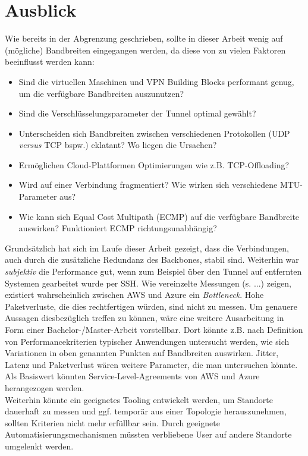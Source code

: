 \section{Ausblick}
Wie bereits in der Abgrenzung geschrieben, sollte in dieser Arbeit wenig auf (mögliche) Bandbreiten eingegangen werden, da diese von zu vielen Faktoren beeinflusst werden kann:
\begin{itemize}
    \item Sind die virtuellen Maschinen und VPN Building Blocks performant genug, um die verfügbare Bandbreiten auszunutzen?
    \item Sind die Verschlüsselungsparameter der Tunnel optimal gewählt?
    \item Unterscheiden sich Bandbreiten zwischen verschiedenen Protokollen (UDP \textit{versus} TCP bspw.) eklatant? Wo liegen die Ursachen?
    \item Ermöglichen Cloud-Plattformen Optimierungen wie z.B. TCP-Offloading?
    \item Wird auf einer Verbindung fragmentiert? Wie wirken sich verschiedene MTU-Parameter aus?
    \item Wie kann sich Equal Cost Multipath (ECMP) auf die verfügbare Bandbreite auswirken? Funktioniert ECMP richtungsunabhängig?
\end{itemize}
Grundsätzlich hat sich im Laufe dieser Arbeit gezeigt, dass die Verbindungen, auch durch die zusätzliche Redundanz des Backbones, stabil sind. Weiterhin war \textit{subjektiv} die Performance gut, wenn zum Beispiel über den Tunnel auf entfernten Systemen gearbeitet wurde per SSH. Wie vereinzelte Messungen (s. ...) zeigen, existiert wahrscheinlich zwischen AWS und Azure ein \textit{Bottleneck}. Hohe Paketverluste, die dies rechtfertigen würden, sind nicht zu messen.
Um genauere Aussagen diesbezüglich treffen zu können, wäre eine weitere Ausarbeitung in Form einer Bachelor-/Master-Arbeit vorstellbar. Dort könnte z.B. nach Definition von Performancekriterien typischer Anwendungen untersucht werden, wie sich Variationen in oben genannten Punkten auf Bandbreiten auswirken. Jitter, Latenz und Paketverlust wären weitere Parameter, die man untersuchen könnte. Als Basiswert könnten Service-Level-Agreements von AWS und Azure herangezogen werden.\\
Weiterhin könnte ein geeignetes Tooling entwickelt werden, um Standorte dauerhaft zu messen und ggf. temporär aus einer Topologie herauszunehmen, sollten Kriterien nicht mehr erfüllbar sein. Durch geeignete Automatisierungsmechanismen müssten verbliebene User auf andere Standorte \glqq umgelenkt\grqq{} werden.
